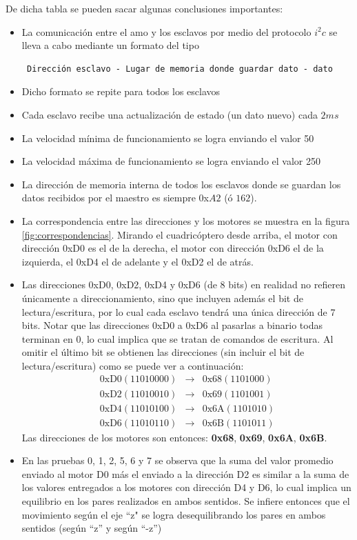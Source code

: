 \documentclass[spanish,12pt,a4paper,titlepage]{report}
\begin{document}
De dicha tabla se pueden sacar algunas conclusiones importantes:
\begin{itemize}
\item La comunicación entre el amo y los esclavos por medio del protocolo $i^2c$ se lleva a cabo mediante un  formato del tipo \begin{verbatim} Dirección esclavo - Lugar de memoria donde guardar dato - dato \end{verbatim}
\item Dicho formato se repite para todos los esclavos
\item Cada esclavo recibe una actualización de estado (un dato nuevo) cada $2 ms$
\item La velocidad mínima de funcionamiento se logra enviando el valor 50
\item La velocidad máxima de funcionamiento se logra enviando el valor 250
\item La dirección de memoria interna de todos los esclavos donde se guardan los datos recibidos por el maestro es siempre 0x$A2$ (ó $162$).
\item La correspondencia entre las direcciones y los motores se muestra en la figura \ref{fig:correspondencias}. Mirando el cuadricóptero desde arriba, el motor con dirección 0xD0 es el de la derecha, el motor con dirección 0xD6 el de la izquierda, el 0xD4 el de adelante y el 0xD2 el de atrás.
\item Las direcciones 0xD0, 0xD2, 0xD4 y 0xD6 (de 8 bits) en realidad no refieren únicamente a direccionamiento, sino que incluyen además el bit de lectura/escritura, por lo cual cada esclavo tendrá una única dirección de 7 bits. Notar que las direcciones 0xD0 a 0xD6 al pasarlas a binario todas terminan en 0, lo cual implica que se tratan de comandos de escritura. Al omitir el último bit se obtienen las direcciones (sin incluir el bit de lectura/escritura) como se puede ver a continuación:
\begin{eqnarray}
\mathrm{0xD0} (11010000) &\longrightarrow &\mathrm{0x68} (1101000) \\
\mathrm{0xD2} (11010010) &\longrightarrow &\mathrm{0x69} (1101001) \\
\mathrm{0xD4} (11010100) &\longrightarrow &\mathrm{0x6A} (1101010) \\
\mathrm{0xD6} (11010110) &\longrightarrow &\mathrm{0x6B} (1101011) 
\end{eqnarray}
Las direcciones de los motores son entonces: \textbf{0x68}, \textbf{0x69}, \textbf{0x6A}, \textbf{0x6B}.
\item En las pruebas 0, 1, 2, 5, 6 y 7 se observa que la suma del valor promedio enviado al motor D0 más el enviado a la dirección D2 es similar a la suma de los valores entregados a los motores con dirección D4 y D6, lo cual implica un equilibrio en los pares realizados en ambos sentidos. Se infiere entonces que el movimiento según el eje ``z" se logra desequilibrando los pares en ambos sentidos (según ``z'' y según ``-z'')
\end{itemize}
\end{document}
